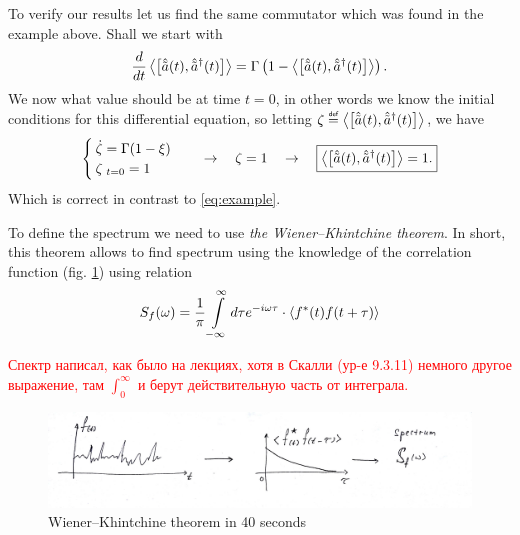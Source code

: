 To verify our results let us find the same commutator which was found in the example above. Shall we start with
\begin{equation}
	\frac{d}{dt} \left\langle {\left[ \hat{\tilde{a}}(t), \hat{\tilde{a}}^{\dagger}(t) \right]} \right\rangle = \Gamma \left( 1 - \left\langle {\left[ \hat{\tilde{a}}(t), \hat{\tilde{a}}^{\dagger}(t) \right]} \right\rangle \right).
\end{equation}
We now what value should be at time $t=0$, in other words we know the initial conditions for this differential equation, so letting $\zeta \myeq \av{\left[ \hat{\tilde{a}}(t), \hat{\tilde{a}}^{\dagger}(t) \right]}$, we have
\begin{equation}
	\begin{cases}
		\dot{\zeta} = \Gamma (1 - \xi) \\
		\zeta_{\ t=0} = 1
	\end{cases}
	\quad \to \quad \zeta = 1 \quad \to \quad \boxed{\left\langle {\left[ \hat{\tilde{a}}(t), \hat{\tilde{a}}^{\dagger}(t) \right]} \right\rangle = 1.}
\end{equation}
Which is correct in contrast to \eqref{eq:example}.

To define the spectrum we need to use \textit{the Wiener--Khintchine theorem}. In short, this theorem allows to find spectrum using the knowledge of the correlation function (fig. \ref{fig:wiener}) using relation
\begin{equation}
	S_f(\omega) = \frac{1}{\pi} \int \limits_{-\infty}^{\infty} d \tau e^{-i \omega \tau} \cdot \left\langle {f^*(t) f(t + \tau)} \right\rangle 
\end{equation}
\begin{otherlanguage}{russian}	
	\textcolor{red}{Спектр написал, как было на лекциях, хотя в Скалли (ур-е 9.3.11) немного другое выражение, там $\int_0^{\infty}$ и берут действительную часть от интеграла.}
\end{otherlanguage}

\begin{figure}
	\centering
	\includegraphics[width=0.85\linewidth]{fig/L9/wiener}
	\caption{Wiener--Khintchine theorem in 40 seconds}
	\label{fig:wiener}
\end{figure}


